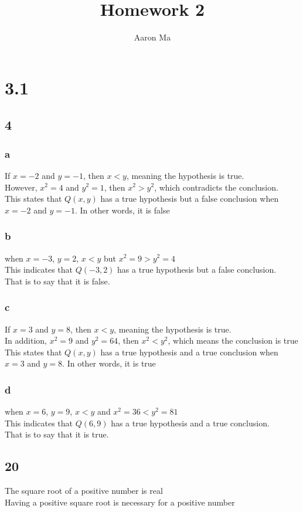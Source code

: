 \documentclass{article}
\title{Homework 2}
\author{Aaron Ma}
\begin{document}
\maketitle
\section{3.1}
\subsection{4}
\subsubsection{a}
If $x = -2$ and $y = -1$,
then $x < y$, meaning the hypothesis is true.\\
However, $x^2 = 4$ and $y^2 = 1$,
then $x^2 > y^2$, which contradicts the conclusion.\\
This states that $Q(x,y)$ has a true hypothesis but a false conclusion when $x = -2$ and $y = -1$. In other words, it is false\\
\subsubsection{b}
when $x = -3$, $y = 2$,
$x < y$ but $x^2 = 9 > y^2 = 4$\\
This indicates that $Q(-3,2)$ has a true hypothesis but a false conclusion.\\
That is to say that it is false.
\subsubsection{c}
If $x = 3$ and $y = 8$,
then $x < y$, meaning the hypothesis is true.\\
In addition, $x^2 = 9$ and $y^2 = 64$,
then $x^2 < y^2$, which means the conclusion is true\\
This states that $Q(x,y)$ has a true hypothesis and a true conclusion when $x = 3$ and $y = 8$. In other words, it is true\\
\subsubsection{d}
when $x = 6$, $y = 9$,
$x < y$ and $x^2 = 36 < y^2 = 81$\\
This indicates that $Q(6,9)$ has a true hypothesis and a true conclusion.\\
That is to say that it is true.\\
\subsection{20}
The square root of a positive number is real\\
Having a positive square root is necessary for a positive number\\
\end{document}
